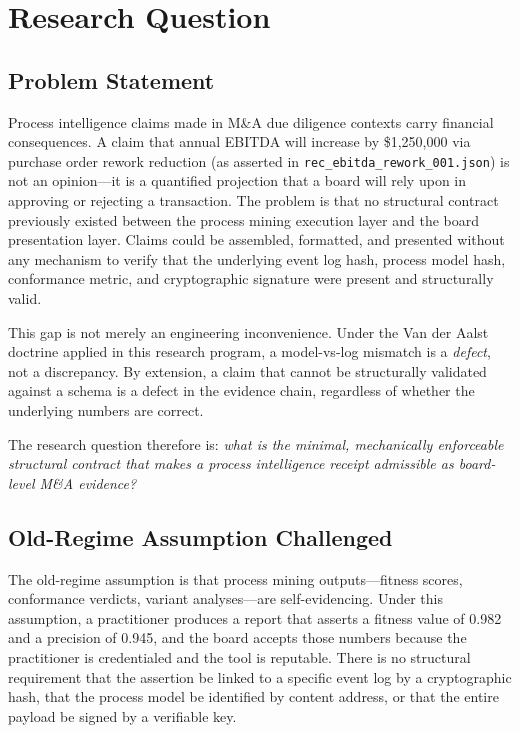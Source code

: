 
\section{Research Question}
\label{sec:schemas-research-question}

\subsection{Problem Statement}
\label{sec:schemas-research-question-problem}

Process intelligence claims made in M\&A due diligence contexts carry financial consequences.
A claim that annual EBITDA will increase by \$1,250,000 via purchase order rework reduction
(as asserted in \texttt{rec\_ebitda\_rework\_001.json}) is not an opinion---it is a quantified
projection that a board will rely upon in approving or rejecting a transaction. The problem is
that no structural contract previously existed between the process mining execution layer and the
board presentation layer. Claims could be assembled, formatted, and presented without any
mechanism to verify that the underlying event log hash, process model hash, conformance metric,
and cryptographic signature were present and structurally valid.

This gap is not merely an engineering inconvenience. Under the Van der Aalst doctrine applied in
this research program, a model-vs-log mismatch is a \emph{defect}, not a discrepancy. By
extension, a claim that cannot be structurally validated against a schema is a defect in the
evidence chain, regardless of whether the underlying numbers are correct.

The research question therefore is: \emph{what is the minimal, mechanically enforceable structural
contract that makes a process intelligence receipt admissible as board-level M\&A evidence?}

\subsection{Old-Regime Assumption Challenged}
\label{sec:schemas-research-question-old-regime}

The old-regime assumption is that process mining outputs---fitness scores, conformance verdicts,
variant analyses---are self-evidencing. Under this assumption, a practitioner produces a report
that asserts a fitness value of 0.982 and a precision of 0.945, and the board accepts those
numbers because the practitioner is credentialed and the tool is reputable. There is no structural
requirement that the assertion be linked to a specific event log by a cryptographic hash, that the
process model be identified by content address, or that the entire payload be signed by a verifiable
key.

